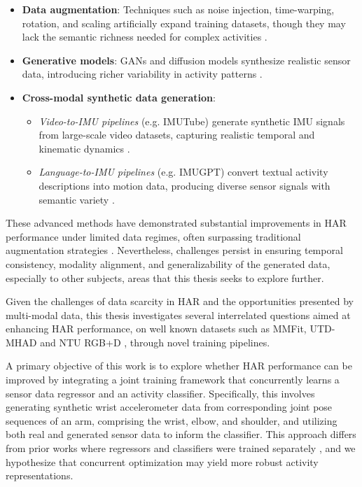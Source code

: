\begin{itemize}
    \item \textbf{Data augmentation}: Techniques such as noise injection, time-warping, rotation, and scaling artificially expand training datasets, though they may lack the semantic richness needed for complex activities \cite{um2017data}.
    \item \textbf{Generative models}: GANs and diffusion models synthesize realistic sensor data, introducing richer variability in activity patterns \cite{li2024diffusionhar}.
    \item \textbf{Cross-modal synthetic data generation}:
    \begin{itemize}
        \item \textit{Video-to-IMU pipelines} (e.g. IMUTube) generate synthetic IMU signals from large-scale video datasets, capturing realistic temporal and kinematic dynamics \cite{kwon2020imutube}.
        \item \textit{Language-to-IMU pipelines} (e.g. IMUGPT) convert textual activity descriptions into motion data, producing diverse sensor signals with semantic variety \cite{leng2024imugpt}.
    \end{itemize}
\end{itemize}

These advanced methods have demonstrated substantial improvements in HAR performance under limited data regimes, often surpassing traditional augmentation strategies \cite{kwon2020imutube, leng2024imugpt, li2024diffusionhar}. Nevertheless, challenges persist in ensuring temporal consistency, modality alignment, and generalizability of the generated data, especially to other subjects, areas that this thesis seeks to explore further.

Given the challenges of data scarcity in HAR and the opportunities presented by multi-modal data, this thesis investigates several interrelated questions aimed at enhancing HAR performance, on well known datasets such as MMFit, UTD-MHAD and NTU RGB+D \cite{stromback2020mm, chen2015utd, shahroudy2016ntu}, through novel training pipelines.

A primary objective of this work is to explore whether HAR performance can be improved by integrating a joint training framework that concurrently learns a sensor data regressor and an activity classifier. Specifically, this involves generating synthetic wrist accelerometer data from corresponding joint pose sequences of an arm, comprising the wrist, elbow, and shoulder, and utilizing both real and generated sensor data to inform the classifier. This approach differs from prior works where regressors and classifiers were trained separately \cite{kwon2020imutube, fortes2021translating, santhalingam2023synthetic}, and we hypothesize that concurrent optimization may yield more robust activity representations.

